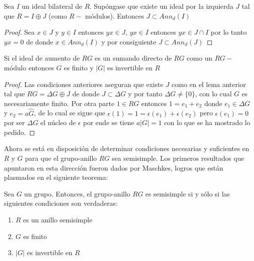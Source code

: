 \begin{lema}
Sea $I$ un ideal bilateral de $R$. Supóngase que existe un ideal por la izquierda $J$ tal que $R = I \oplus J$ (como $R-$ módulos). Entonces $J \subset Ann_d(I) $
\end{lema}

\begin{proof}
Sea $x \in J$ y $y \in I $ entonces $yx \in J$, $yx \in I$ entonces $yx \in J\cap I$ por lo tanto $yx=0$ de donde $x \in Ann_d(I)$ y por consiguiente $J \subset Ann_d(J)$ \qedhere 
\end{proof}

\begin{lema}\label{aumento}
Si el ideal de aumento de $RG$ es un sumando directo de $RG$ como un $RG-$módulo entonces $G$ es finito y $|G|$ es invertible en $R$
\end{lema}

\begin{proof}
Las condiciones anteriores aseguran que existe $J$ como en el lema anterior tal que $RG = \Delta G \oplus J$ de donde $J \subset \Delta G$  y por tanto $\Delta G \neq \{ 0 \}$, con lo cual $G$ es necesariamente finito.
Por otra parte $1 \in RG$ entonces $1 = e_1 + e_2$ donde $e_1 \in \Delta G$ y $e_2=a\hat{G}$, de lo cual se sigue que $\epsilon(1) = 1 = \epsilon(e_1) + \epsilon(e_2)$ pero $\epsilon(e_1) = 0$ por ser $\Delta G$ el núcleo de $\epsilon$ por ende se tiene $a|G| = 1$ con lo que se ha mostrado lo pedido. \qedhere
\end{proof}

Ahora se está en disposición de determinar condiciones necesarias y suficientes en $R$ y $G$ para que el grupo-anillo $RG$ sea semisimple. Los primeros resultados que apuntaron en esta dirección fueron dados por Maschkes, logros que están plasmados en el siguiente teorema:

\begin{teorema}[Maschke]
Sea $G$ un grupo. Entonces, el grupo-anillo $RG$ es semisimple si y sólo si las siguientes condiciones son verdaderas:
\begin{enumerate}
\item $R$ es un anillo semisimple
\item $G$ es finito
\item $|G|$ es invertible en $R$
\end{enumerate}
\end{teorema}

